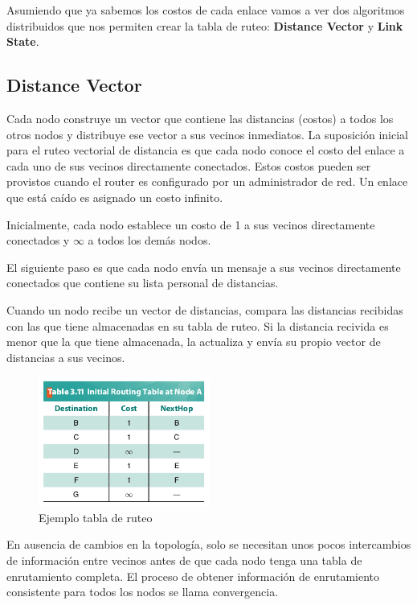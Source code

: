 Asumiendo que ya sabemos los costos de cada enlace vamos a ver dos algoritmos distribuidos que nos permiten crear la tabla de ruteo: \textbf{Distance Vector} y \textbf{Link State}.

\subsection{Distance Vector}
Cada nodo construye un vector que contiene las distancias (costos) a todos los otros nodos y distribuye ese vector a sus vecinos inmediatos. La suposición inicial para el ruteo vectorial de distancia es que cada nodo conoce el costo del enlace a cada uno de sus vecinos directamente conectados. Estos costos pueden ser provistos cuando el router es configurado por un administrador de red. Un enlace que está caído es asignado un costo infinito.

Inicialmente, cada nodo establece un costo de 1 a sus vecinos directamente conectados y \(\infty\) a todos los demás nodos.

El siguiente paso es que cada nodo envía un mensaje a sus vecinos directamente conectados que contiene su lista personal de distancias.

Cuando un nodo recibe un vector de distancias, compara las distancias recibidas con las que tiene almacenadas en su tabla de ruteo. Si la distancia recivida es menor que la que tiene almacenada, la actualiza y envía su propio vector de distancias a sus vecinos.
\begin{figure}[H]
	\centering
	\includegraphics[width=0.5\textwidth
]{images/distance-vector-routing-table.png}
	\caption[Ejemplo tabla de ruteo]{Ejemplo tabla de ruteo}
	\label{fig:distance-vector-routing-table}
\end{figure}

En ausencia de cambios en la topología, solo se necesitan unos pocos intercambios de información entre vecinos antes de que cada nodo tenga una tabla de enrutamiento completa. El proceso de obtener información de enrutamiento consistente para todos los nodos se llama convergencia.

